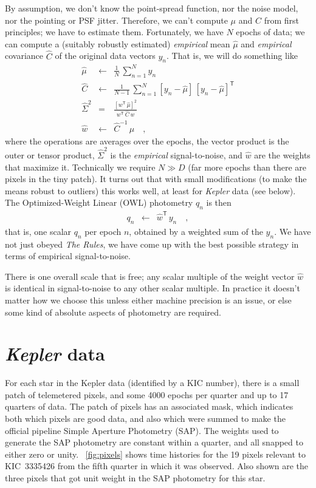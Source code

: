 \documentclass[12pt, letterpaper, preprint]{aastex}
\newcommand{\project}[1]{\textsl{#1}}
\newcommand{\transpose}[1]{{#1}^{\!\mathsf T}}
\newcommand{\inverse}[1]{{#1}^{-1}}
\begin{document}
By assumption, we don't know the point-spread function,
  nor the noise model,
  nor the pointing or PSF jitter.
Therefore, we can't compute $\mu$ and $C$ from first principles; we have to estimate them.
Fortunately, we have $N$ epochs of data;
  we can compute a (suitably robustly estimated)
  \emph{empirical} mean $\hat{\mu}$ and \emph{empirical} covariance $\hat{C}$
  of the original data vectors $y_n$.
That is, we will do something like
\begin{eqnarray}
  \hat{\mu} &\leftarrow& \frac{1}{N}\,\sum_{n=1}^N y_n
  \\
  \hat{C} &\leftarrow& \frac{1}{N-1}\,\sum_{n=1}^N [y_n - \hat{\mu}]\,\transpose{[y_n - \hat{\mu}]}
  \\
  \hat{\Sigma}^2 &=& \frac{[\transpose{w}\, \hat{\mu}]^2}{\transpose{w}\, \hat{C}\, w}
  \\
  \hat{w} &\leftarrow& \inverse{\hat{C}}\, \hat{\mu}
  \quad ,
\end{eqnarray}
  where the operations are averages over the epochs,
  the vector product is the outer or tensor product,
  $\hat{\Sigma}^2$ is the \emph{empirical} signal-to-noise,
  and $\hat{w}$ are the weights that maximize it.
Technically we require $N \gg D$
  (far more epochs than there are pixels in the tiny patch).
It turns out that with small modifications
  (to make the means robust to outliers)
  this works well, at least for \project{Kepler} data (see below).
The Optimized-Weight Linear (OWL) photometry $q_n$ is then
\begin{eqnarray}
  q_n &\leftarrow& \transpose{\hat{w}}\, y_n
  \quad ,
\end{eqnarray}
  that is, one scalar $q_n$ per epoch $n$, obtained by a weighted sum of the $y_n$.
We have not just obeyed \emph{The Rules},
  we have come up with the best possible strategy in terms of empirical signal-to-noise.

There is one overall scale that is free;
  any scalar multiple of the weight vector $\hat{w}$ is identical in signal-to-noise
  to any other scalar multiple.
In practice it doesn't matter how we choose this unless either machine precision is an issue,
  or else some kind of absolute aspects of photometry are required.

\section{\project{Kepler} data}

For each star in the Kepler data (identified by a KIC number),
  there is a small patch of telemetered pixels,
  and some 4000 epochs per quarter and up to 17 quarters of data.
The patch of pixels has an associated mask,
  which indicates both which pixels are good data,
  and also which were summed to make the official pipeline
  Simple Aperture Photometry (SAP).
The weights used to generate the SAP photometry are constant within a quarter,
  and all snapped to either zero or unity.
\figurename~\ref{fig:pixels} shows time histories for the 19 pixels relevant
  to KIC~3335426 from the fifth quarter in which it was observed.
Also shown are the three pixels that got unit weight in the SAP photometry for this star.
\end{document}
